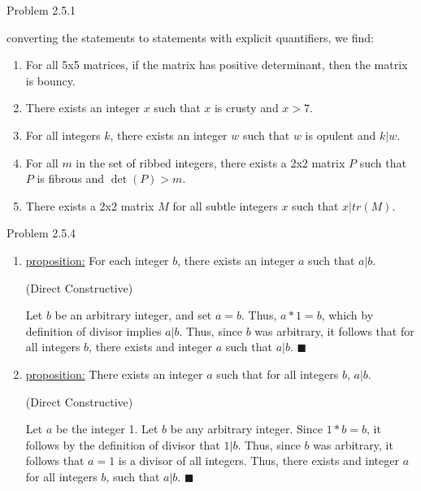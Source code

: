 \documentclass{article}
\theoremstyle{definition}
\begin{document}

	\noindent Problem 2.5.1  \vspace{0.3cm}

	converting the statements to statements with explicit quantifiers,
	we find:

	\begin{enumerate}
		\item For all 5x5 matrices, if the matrix has positive determinant,
		then the matrix is bouncy.
		\item There exists an integer $x$ such that $x$ is crusty and $x>7$.
		\item For all integers $k$, there exists an integer $w$ such that
		$w$ is opulent and $k|w$.
		\item For all $m$ in the set of ribbed integers, there exists a 2x2
		matrix $P$ such that $P$ is fibrous and $\det(P)>m$.
		\item There exists a 2x2 matrix $M$ for all subtle integers $x$ such
		that $x|tr(M)$.
	\end{enumerate}

	\vspace{1cm}




	\noindent Problem 2.5.4  \vspace{0.3cm}

	\begin{enumerate}
		\item[3] \underline{proposition:} For each integer $b$, there exists
		an integer $a$ such that $a|b$.

		\vspace{.2cm}

		 (Direct Constructive)

		Let $b$ be an arbitrary integer, and set $a=b$. Thus, $a*1=b$,
		which by definition of divisor implies $a|b$. Thus, since $b$ was
		arbitrary, it follows that for all integers $b$, there exists and
		integer $a$ such that $a|b$. $\blacksquare$

		\item[4] \underline{proposition:} There exists an integer $a$ such
		that for all integers $b$, $a|b$.

		\vspace{.2cm}

		 (Direct Constructive)

		Let $a$ be the integer 1. Let $b$ be any arbitrary integer. Since
		$1*b=b$, it follows by the definition of divisor that $1|b$. Thus,
		since $b$ was arbitrary, it follows that $a=1$ is a divisor of all
		integers. Thus, there exists and integer $a$ for all integers $b$,
		such that $a|b$.  $\blacksquare$

	\end{enumerate}
\end{document}

